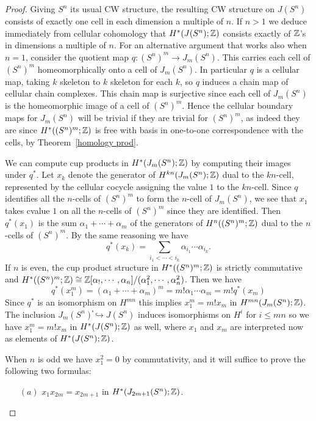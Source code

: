 \begin{proof}
Giving $S^n$ its usual CW structure, the resulting CW structure on $J(S^n)$ consists of exactly one cell in each dimension a multiple of $n$. If $n>1$ we deduce immediately from cellular cohomology that $H^*(J(S^n);\mathbb{Z})$ consists exactly of $\mathbb{Z}$'s in dimensions a multiple of $n$. For an alternative argument that works also when $n=1$, consider the quotient map $q:(S^n)^m\to J_m(S^n)$. This carries each cell of $(S^n)^m$ homeomorphically onto a cell of $J_m(S^n)$. In particular $q$ is a cellular map, taking $k$ skeleton to $k$ skeleton for each $k$, so $q$ induces a chain map of cellular chain complexes. This chain map is surjective since each cell of $J_m(S^n)$ is the homeomorphic image of a cell of $(S^n)^m$. Hence the cellular boundary maps for $J_m(S^n)$ will be trivial if they are trivial for $(S^n)^m$, as indeed they are since $H^*((S^n)^m;\mathbb{Z})$ is free with basis in one-to-one correspondence with the cells, by Theorem~\ref{homology prod}.\par
We can compute cup products in $H^*(J_m(S^n);\mathbb{Z})$ by computing their images under $q^*$. Let $x_k$ denote the generator of $H^{kn}(J_m(S^n);\mathbb{Z})$ dual to the $kn$-cell, represented by the cellular cocycle assigning the value $1$ to the $kn$-cell. Since $q$ identifies all the $n$-cells of $(S^n)^m$ to form the $n$-cell of $J_m(S^n)$, we see that $x_1$ takes cvalue $1$ on all the $n$-cells of $(S^n)^m$ since they are identified. Then $q^*(x_1)$ is the sum $\alpha_1+\cdots+\alpha_m$ of the generators of $H^n((S^n)^m;\mathbb{Z})$ dual to the $n$-cells of $(S^n)^m$. By the same reasoning we have 
\[q^*(x_k)=\sum_{i_1<\cdots<i_k}\alpha_{i_1}\cdots\alpha_{i_k}.\]
If $n$ is even, the cup product structure in $H^*((S^n)^m;\mathbb{Z})$ is strictly commutative and $H^*((S^n)^m;\mathbb{Z})\cong\mathbb{Z}[\alpha_!,\cdots,\alpha_n]/(\alpha_1^2,\cdots,\alpha_n^2)$. Then we have
\[q^*(x_1^m)=(\alpha_1+\cdots+\alpha_m)^m=m!\alpha_1\cdots\alpha_m=m!q^*(x_m)\]
Since $q^*$ is an isomorphism on $H^{mn}$ this implies $x_1^m=m!x_m$ in $H^{mn}(J_m(S^n);\mathbb{Z})$. The inclusion $J_m(S^n)֓\hookrightarrow J(S^n)$ induces isomorphisms on $H^i$ for $i\leq mn$ so we have $x^m_1=m!x_m$ in $H^*(J(S^n);\mathbb{Z})$ as well, where $x_1$ and $x_m$ are interpreted now as elements of $H^*(J(S^n);\mathbb{Z})$.\par
When $n$ is odd we have $x^2_1=0$ by commutativity, and it will suffice to prove the following two formulas:
\begin{itemize}
\item[$(a)$] $x_1x_{2m}=x_{2m+1}$ in $H^*(J_{2m+1}(S^n);\mathbb{Z})$.

\end{itemize}
\end{proof}

